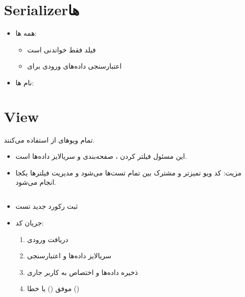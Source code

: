 \documentclass{report}
\begin{document}
\section{Serializerها}
\begin{itemize}
    \item همه ها:
    \begin{itemize}
        \item فیلد  فقط خواندنی است
        \item اعتبارسنجی داده‌های ورودی برای 
    \end{itemize}
    \item نام ها: 
\end{itemize}

\section{View}
تمام ویوهای  از  استفاده می‌کنند.
\begin{itemize}
    \item این  مسئول فیلتر کردن ، صفحه‌بندی و سریالایز داده‌ها است.
    \item مزیت: کد ویو تمیزتر و مشترک بین تمام تست‌ها می‌شود و مدیریت فیلترها یکجا انجام می‌شود.
\end{itemize}

\subsection{}
\begin{itemize}
    \item ثبت رکورد جدید تست
    \item جریان کد:
    \begin{enumerate}
        \item دریافت  ورودی
        \item سریالایز داده‌ها و اعتبارسنجی
        \item ذخیره داده‌ها و اختصاص  به کاربر جاری
        \item {} موفق () یا خطا ()
    \end{enumerate}
\end{itemize}
\end{document}

